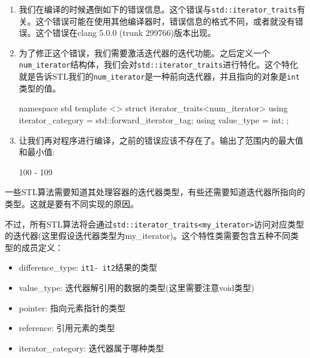 \begin{enumerate}
\item 我们在编译的时候遇倒如下的错误信息。这个错误与\texttt{std::iterator\_traits}有关。这个错误可能在使用其他编译器时，错误信息的格式不同，或者就没有错误。这个错误在clang 5.0.0 (trunk 299766)版本出现。


\item 为了修正这个错误，我们需要激活迭代器的迭代功能。之后定义一个\texttt{num\_iterator}结构体，我们会对\texttt{std::iterator\_traits}进行特化。这个特化就是告诉STL我们的\texttt{num\_iterator}是一种前向迭代器，并且指向的对象是\texttt{int}类型的值。

\begin{codebox}[cpp]
namespace std {
template <>
struct iterator_traits<num_iterator> {
    using iterator_category = std::forward_iterator_tag;
    using value_type = int;
};
}
\end{codebox}

\item 让我们再对程序进行编译，之前的错误应该不存在了。输出了范围内的最大值和最小值:

\begin{codebox}[cpp]
100 - 109
\end{codebox}

\end{enumerate}


一些STL算法需要知道其处理容器的迭代器类型，有些还需要知道迭代器所指向的类型。这就是要有不同实现的原因。

不过，所有STL算法将会通过\texttt{std::iterator\_traits<my\_iterator>}访问对应类型的迭代器(这里假设迭代器类型为my\_iterator)。这个特性类需要包含五种不同类型的成员定义：

\begin{itemize}
\item difference\_type: \texttt{it1- it2}结果的类型

\item value\_type: 迭代器解引用的数据的类型(这里需要注意void类型)

\item pointer: 指向元素指针的类型

\item reference: 引用元素的类型

\item iterator\_category: 迭代器属于哪种类型

\end{itemize}

